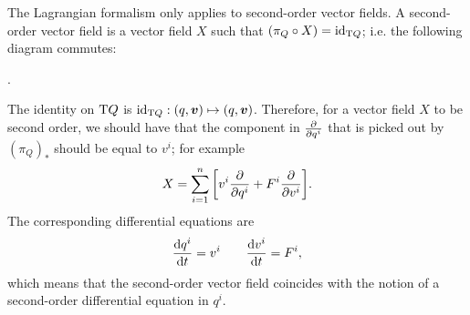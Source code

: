 The Lagrangian formalism only applies to second-order vector fields. A second-order vector field is a vector field \(X\) such that \((\pi_Q \circ X) = \mathrm{id}_{\mathrm{T}Q}\); i.e. the following diagram commutes: \cite{Abraham1978}
\begin{center}
   .
\end{center}
The identity on \(\mathrm{T}Q\) is \(\mathrm{id}_{\tbundle{Q}}: (q, \vec{v}) \mapsto (q, \vec{v})\). Therefore, for a vector field \(X\) to be second order, we should have that the component in \(\pdv{}{q^i}\) that is picked out by \((\pi_Q)_*\) should be equal to \(v^i\); for example
\begin{equation}
     X = \sum_{i=1}^n \qty[v^i \pdv{q^i} + F^i\pdv{v^i}].
\end{equation}
The corresponding differential equations are
\begin{equation}
     \dv{q^i}{t} = v^i \qquad \dv{v^i}{t} = F^i,
\end{equation}
which means that the second-order vector field coincides with the notion of a second-order differential equation in \(q^i\).

